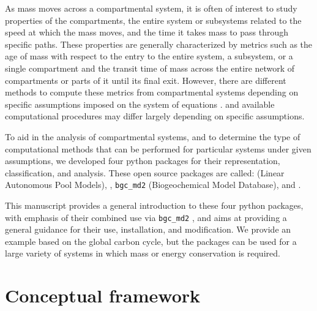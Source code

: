 As mass moves across a compartmental system, it is often of interest to study
properties of the compartments, the entire system or subsystems related to the speed at
which the mass moves, and the time it takes mass to pass through specific
paths. These properties are generally characterized
by metrics such as the age of mass with respect to the entry to the entire
system, a subsystem, or a single compartment and the transit time of mass 
across the entire network of compartments or parts of it until its
final exit. 
However, there are different methods to compute these metrics from
compartmental systems depending on specific assumptions imposed on the system
of equations \citep{Sierra2017GCB}. and available computational
procedures may differ largely depending on specific assumptions.

To aid in the analysis of compartmental systems, and to determine the type of
computational methods that can be performed for particular systems under given
assumptions, we developed four python packages for their representation,
classification, and analysis. These open source packages are called: 
\LAPM (Linear Autonomous Pool Models),
\CompartmentalSystems, 
\texttt{bgc\_md2} (Biogeochemical Model Database), and
\ComputabilityGraphs.

This manuscript provides a general introduction to these four python packages,
with emphasis of their combined use via \texttt{bgc\_md2} ,
and aims at providing a general guidance for their use, installation, and
modification. 
We provide an example based on the global carbon cycle, but the
packages can be used for a large variety of systems in which mass or energy
conservation is required.

\section{Conceptual framework}
